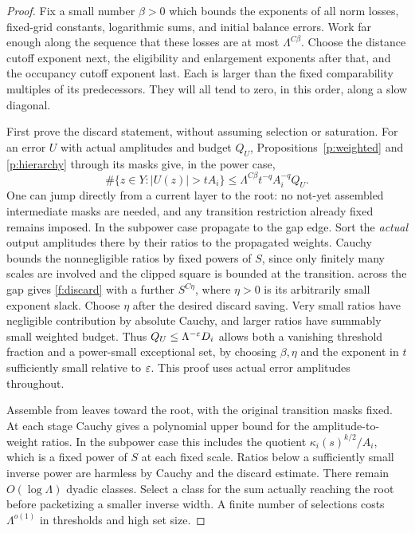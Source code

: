 \begin{proof}
Fix a small number $\beta>0$ which bounds the exponents of all norm
losses, fixed-grid constants, logarithmic sums, and initial balance
errors. Work far enough along the sequence that these losses are at
most $\Lambda^{C\beta}$. Choose the distance cutoff exponent next,
the eligibility and enlargement exponents after that, and the
occupancy cutoff exponent last. Each is larger than the fixed
comparability multiples of its predecessors. They will all tend to
zero, in this order, along a slow diagonal.

First prove the discard statement, without assuming selection or
saturation. For an error $U$ with actual amplitudes and budget $Q_U$,
Propositions~\ref{p:weighted} and \ref{p:hierarchy} through its masks
give, in the power case,
\begin{equation}\label{f:discard}
 \#\{z\in Y:|U(z)|>tA_i\}
 \le\Lambda^{C\beta}t^{-q}A_i^{-q}Q_U.
\end{equation}
One can jump directly from a current layer to the root: no not-yet
assembled intermediate masks are needed, and any transition
restriction already fixed remains imposed. In the subpower case
propagate to the gap edge. Sort the \emph{actual} output amplitudes
there by their ratios to the propagated weights. Cauchy bounds the
nonnegligible ratios by fixed powers of $S$, since only finitely many
scales are involved and the clipped square is bounded at the
transition.  across the gap gives
\eqref{f:discard} with a further $S^{C\eta}$, where $\eta>0$ is its
arbitrarily small exponent slack. Choose $\eta$ after the desired
discard saving. Very small ratios have negligible contribution by
absolute Cauchy, and larger ratios have summably small weighted
budget. Thus $Q_U\le\Lambda^{-\varepsilon}D_i$ allows both a vanishing
threshold fraction and a power-small exceptional set, by choosing
$\beta,\eta$ and the exponent in $t$ sufficiently small relative to
$\varepsilon$. This proof uses actual error amplitudes throughout.

Assemble from leaves toward the root, with the original transition
masks fixed. At each stage Cauchy gives a polynomial upper bound for
the amplitude-to-weight ratios. In the subpower case this includes
the quotient $\kappa_i(s)^{k/2}/A_i$, which is a fixed power of $S$ at
each fixed scale. Ratios below a sufficiently small inverse power
are harmless by Cauchy and the discard estimate. There remain
$O(\log\Lambda)$ dyadic classes. Select a class for the sum actually
reaching the root before packetizing a smaller inverse width. A finite
number of selections costs $\Lambda^{o(1)}$ in thresholds and high
set size.


\end{proof}
